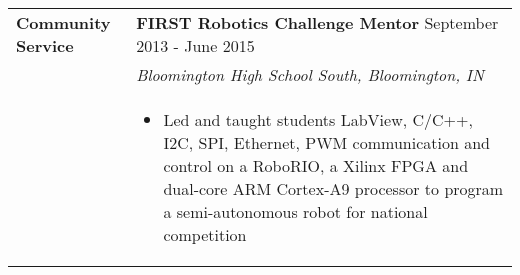 \begin{tabular}{L{\hlcolw}  L{\rcolw}}
\textbf{\Large Community Service} & \textbf{\large FIRST Robotics Challenge Mentor } \hfill {\large September 2013 - June 2015}  \\
 & \textit{\large Bloomington High School South, Bloomington, IN} \\
& 
\vspace{-0.3in} 

\begin{itemize}[leftmargin = \itemmargin]
	\item Led and taught students LabView, C/C++, I2C, SPI, Ethernet, PWM communication and control on a RoboRIO, a Xilinx FPGA and dual-core ARM Cortex-A9 processor to program a semi-autonomous robot for national competition
\end{itemize} \\

	\hline \hline
\end{tabular}